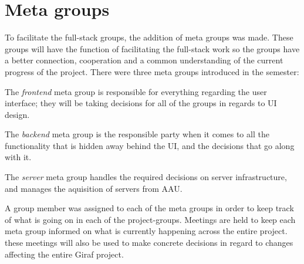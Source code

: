 \section{Meta groups}\label{SEC:MetaGroups}
To facilitate the full-stack groups, the addition of meta groups was made.
These groups will have the function of facilitating the full-stack work so the groups have a better connection, cooperation and a common understanding of the current progress of the project.
There were three meta groups introduced in the semester:

The \textit{frontend} meta group is responsible for everything regarding the user interface; they will be taking decisions for all of the groups in regards to UI design.

The \textit{backend} meta group is the responsible party when it comes to all the functionality that is hidden away behind the UI, and the decisions that go along with it.

The \textit{server} meta group handles the required decisions on server infrastructure, and manages the aquisition of servers from AAU.

A group member was assigned to each of the meta groups in order to keep track of what is going on in each of the project-groups. 
Meetings are held to keep each meta group informed on what is currently happening across the entire project. 
these meetings will also be used to make concrete decisions in regard to changes affecting the entire Giraf project.
